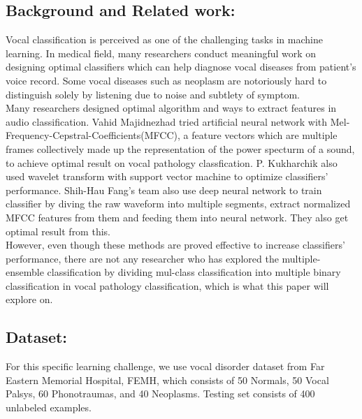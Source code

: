 \subsection{Background and Related work:}
	Vocal classification is perceived as one of the challenging tasks in machine learning. In medical field, many researchers conduct meaningful work on designing optimal classifiers which can help diagnose vocal diseases from patient's voice record. Some vocal diseases such as neoplasm are notoriously hard to distinguish solely by listening due to noise and subtlety of symptom. \\
	\indent Many researchers designed optimal algorithm and ways to extract features in audio classification.
	Vahid Majidnezhad tried artificial neural network with Mel-Frequency-Cepstral-Coefficients(MFCC), a feature vectors which are multiple frames collectively made up the representation of the power specturm of a sound, to achieve optimal result on vocal pathology classfication\cite{b5}. P. Kukharchik also used wavelet transform with support vector machine to optimize classifiers' performance\cite{b4}. Shih-Hau Fang's team also use deep neural network to train classifier by diving the raw waveform into multiple segments, extract normalized MFCC features from them and feeding them into neural network. They also get optimal result from this\cite{b9}.\\
	\indent However, even though these methods are proved effective to increase classifiers' performance, there are not any researcher who has explored the multiple-ensemble classification by dividing mul-class classification into multiple binary classification in vocal pathology classification, which is what this paper will explore on. 
\subsection{Dataset: }
For this specific learning challenge, we use vocal disorder dataset from Far Eastern Memorial Hospital, FEMH\cite{b11}, which consists of 50 Normals, 50 Vocal Palsys, 60 Phonotraumas, and 40 Neoplasms. Testing set consists of 400 unlabeled examples. 
	